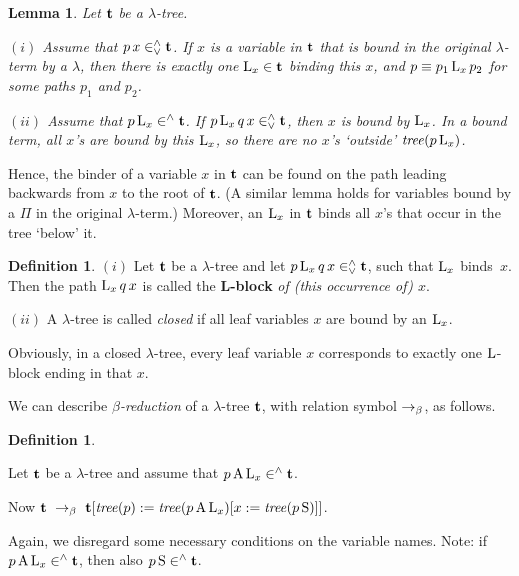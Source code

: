 \documentclass{article}
\theoremstyle{plain}
\newtheorem{Lem}[The]{Lemma}
\theoremstyle{definition}
\newtheorem{Def}[The]{Definition}
\begin{document}
\begin{Lem}\label{LemTreBou} Let ${\bf t}$ be a $\lambda$-tree.

$(i)$  Assume that $p\, x \in^\wedge_\vee {\bf t}$. If $x$ is a variable in ${\bf t}$ that is bound in the original $\lambda$-term by a $\lambda$, then there is exactly one ${\rm L}_x \in {\bf t}$ binding this $x$, and $p \equiv p_1 \, {\rm L}_x \, p_2$ for some paths $p_1$ and $p_2$.

$(ii)$ Assume that $p \, {\rm L}_x \in^\wedge {\bf t}$. If $p \, {\rm L}_x \, q \, x \in^\wedge_\vee {\bf t}$, then $x$ is bound by ${\rm L}_x$. In a {\em bound\/} term, all $x$'s are bound by this ${\rm L}_x$, so there are no $x$'s `outside' ${\it tree}(p \, {\rm L}_x)$.
\end{Lem}



Hence, the binder of a variable $x$ in ${\bf t}$ can be found on the path leading backwards from $x$ to the root of ${\bf t}$. (A similar lemma holds for variables bound by a $\Pi$ in the original $\lambda$-term.)
Moreover, an ${\rm L}_x$ in ${\bf t}$ binds all $x$'s that occur in the tree `below' it.

\begin{Def}\label{DefLBlo}
$(i)$ Let ${\bf t}$ be a $\lambda$-tree and let $p \, {\rm L}_x \, q \, x \in^\wedge_\vee {\bf t}$, such that ${\rm L}_x$ binds~$x$. Then the path ${\rm L}_x \, q \, x$ is called the {\bf {\rm L}-block} {\em of (this occurrence of) $x$}.

$(ii)$ A $\lambda$-tree is called {\it closed\/} if all leaf variables $x$ are bound by an ${\rm L}_x$.
\end{Def}

Obviously, in a closed $\lambda$-tree, every leaf variable $x$ corresponds to exactly one ${\rm L}$-block ending in that $x$.

\medskip

We can describe {\em $\beta$-reduction\/} of a $\lambda$-tree ${\bf t}$, with relation symbol $\rightarrow_{\beta}$, as follows.

\begin{Def}\label{DefBetTre}

Let ${\bf t}$ be a $\lambda$-tree and assume that $p \, {\rm A} \, {\rm L}_x \in^\wedge {\bf t}$.

Now ${\bf t} ~\rightarrow_{\beta}~ {\bf t}[{\it tree}(p) := {\it tree}(p \, {\rm A} \, {\rm L}_x)[x := {\it tree}(p \, {\rm S})]]$.
\end{Def}

Again, we disregard some necessary conditions on the variable names. Note: if $p \, {\rm A} \, {\rm L}_x \in^\wedge {\bf t}$, then also $p \, {\rm S} \in^\wedge {\bf t}$.
\end{document}
